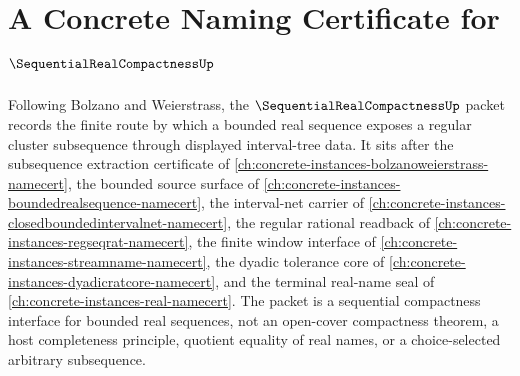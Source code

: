 \chapter{A Concrete Naming Certificate for $\SequentialRealCompactnessUp$}
\label{ch:concrete-instances-sequential-real-compactness-namecert}

Following Bolzano and Weierstrass, the $\SequentialRealCompactnessUp$ packet records the finite route by which a bounded real sequence exposes a regular cluster subsequence through displayed interval-tree data. It sits after the subsequence extraction certificate of \autoref{ch:concrete-instances-bolzanoweierstrass-namecert}, the bounded source surface of \autoref{ch:concrete-instances-boundedrealsequence-namecert}, the interval-net carrier of \autoref{ch:concrete-instances-closedboundedintervalnet-namecert}, the regular rational readback of \autoref{ch:concrete-instances-regseqrat-namecert}, the finite window interface of \autoref{ch:concrete-instances-streamname-namecert}, the dyadic tolerance core of \autoref{ch:concrete-instances-dyadicratcore-namecert}, and the terminal real-name seal of \autoref{ch:concrete-instances-real-namecert}. The packet is a sequential compactness interface for bounded real sequences, not an open-cover compactness theorem, a host completeness principle, quotient equality of real names, or a choice-selected arbitrary subsequence.

